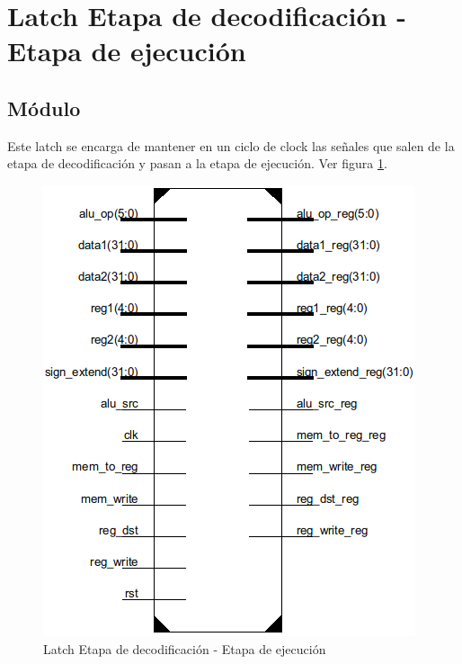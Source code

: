 \section{Latch Etapa de decodificaci\'on - Etapa de ejecuci\'on}

\subsection{M\'odulo}
Este latch se encarga de mantener en un ciclo de clock las señales que salen de la etapa de decodificaci\'on y pasan a la etapa de ejecuci\'on. Ver figura \ref{fig:Latch}.

\begin{figure}[H]
\centering
\includegraphics[scale=0.5]{img/latch_id_ex}
\caption{Latch Etapa de decodificaci\'on - Etapa de ejecuci\'on}
\label{fig:Latch}
\end{figure}

